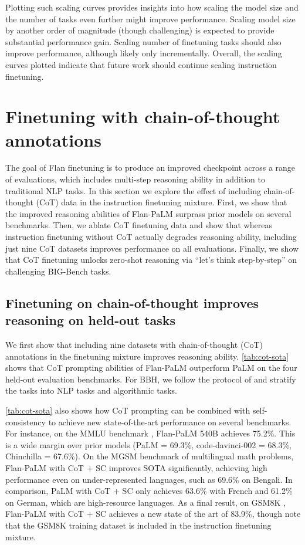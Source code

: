 Plotting such scaling curves provides insights into how scaling the model size and the number of tasks even further might improve performance. Scaling model size by another order of magnitude (though challenging) is expected to provide substantial performance gain. Scaling number of finetuning tasks should also improve performance, although likely only incrementally. Overall, the scaling curves plotted indicate that future work should continue scaling instruction finetuning.

\section{Finetuning with chain-of-thought annotations}\label{sec:finetune-with-cot}

The goal of Flan finetuning is to produce an improved checkpoint across a range of evaluations, which includes multi-step reasoning ability in addition to traditional NLP tasks. In this section we explore the effect of including chain-of-thought (CoT) data in the instruction finetuning mixture. First, we show that the improved reasoning abilities of Flan-PaLM surprass prior models on several benchmarks. Then, we ablate CoT finetuning data and show that whereas instruction finetuning without CoT actually degrades reasoning ability, including just nine CoT datasets improves performance on all evaluations. Finally, we show that CoT finetuning unlocks zero-shot reasoning via ``let's think step-by-step'' on challenging BIG-Bench tasks.

\subsection{Finetuning on chain-of-thought improves reasoning on held-out tasks} We first show that including nine datasets with chain-of-thought (CoT) annotations in the finetuning mixture improves reasoning ability.
\ref{tab:cot-sota} shows that CoT prompting abilities of Flan-PaLM outperform PaLM on the four held-out evaluation benchmarks. For BBH, we follow the protocol of \citet{suzgun2022challenging} and stratify the tasks into NLP tasks and algorithmic tasks.

\ref{tab:cot-sota} also shows how CoT prompting can be combined with self-consistency \citep[SC;][]{wang2022self} to achieve new state-of-the-art performance on several benchmarks. For instance, on the MMLU benchmark \citep{hendrycks2020measuring}, Flan-PaLM 540B achieves 75.2\%. This is a wide margin over prior models (PaLM = 69.3\%, code-davinci-002 = 68.3\%, Chinchilla = 67.6\%).
On the MGSM benchmark of multilingual math problems, Flan-PaLM with CoT + SC improves SOTA significantly, achieving high performance even on under-represented languages, such as 69.6\% on Bengali. In comparison, PaLM with CoT + SC only achieves 63.6\% with French and 61.2\% on German, which are high-resource languages. As a final result, on GSM8K \citep[][not shown in the table]{cobbe2021training}, Flan-PaLM with CoT + SC achieves a new state of the art of 83.9\%, though note that the GSM8K training dataset is included in the instruction finetuning mixture.

